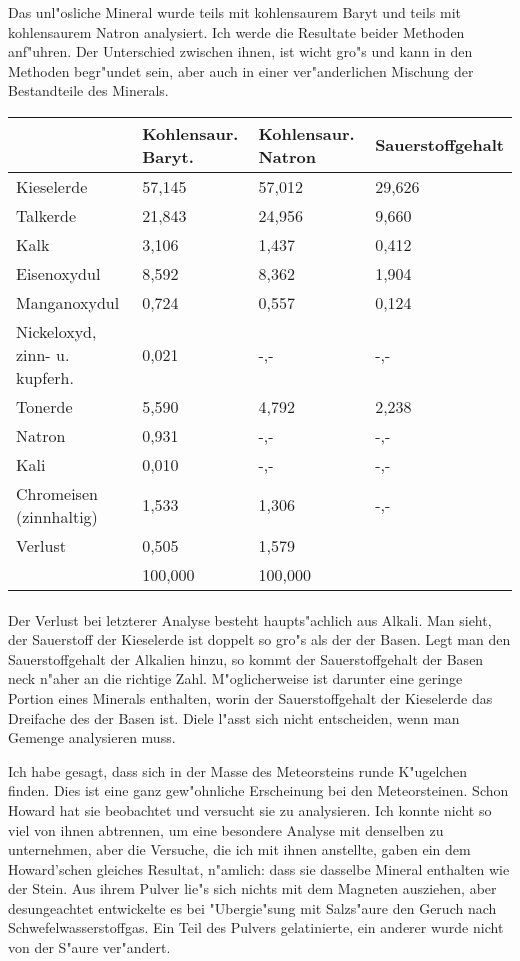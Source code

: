 \documentclass[a4paper, 11pt, oneside]{article}
\begin{document}
Das unl"osliche Mineral wurde teils mit kohlensaurem Baryt und teils mit kohlensaurem Natron analysiert. Ich werde die Resultate beider Methoden anf"uhren. Der Unterschied zwischen ihnen, ist wicht gro"s und kann in den Methoden begr"undet sein, aber auch in einer ver"anderlichen Mischung der Bestandteile des Minerals.
\begin{center}
\begin{tabular}{ |p{33mm}|p{24mm}|p{24mm}|p{35mm}| }
    \hline
      & Kohlensaur. Baryt. & Kohlensaur. Natron & Sauerstoffgehalt\\\hline
    Kieselerde & 57,145 & 57,012 & 29,626\\\hline
    Talkerde & 21,843 & 24,956 & 9,660\\\hline
    Kalk & 3,106 & 1,437 & 0,412\\\hline
    Eisenoxydul & 8,592 & 8,362 & 1,904\\\hline
    Manganoxydul & 0,724 & 0,557  & 0,124\\\hline
    Nickeloxyd, zinn- u. kupferh. & 0,021  & -,-  & -,-\\\hline
    Tonerde & 5,590 & 4,792 & 2,238\\\hline
    Natron & 0,931 & -,- & -,-\\\hline
    Kali & 0,010 & -,-  & -,-\\\hline
    Chromeisen (zinnhaltig) & 1,533 & 1,306 & -,-\\\hline
    Verlust & 0,505 & 1,579 & \\\hline
     & 100,000 & 100,000 & \\
    \hline
\end{tabular}
\end{center}
\paragraph{}
Der Verlust bei letzterer Analyse besteht haupts"achlich aus Alkali. Man sieht, der Sauerstoff der Kieselerde ist doppelt so gro"s als der der Basen. Legt man den Sauerstoffgehalt der Alkalien hinzu, so kommt der Sauerstoffgehalt der Basen neck n"aher an die richtige Zahl. M"oglicherweise ist darunter eine geringe Portion eines Minerals enthalten, worin der Sauerstoffgehalt der Kieselerde das Dreifache des der Basen ist. Diele l"asst sich nicht entscheiden, wenn man Gemenge analysieren muss.

Ich habe gesagt, dass sich in der Masse des Meteorsteins runde K"ugelchen finden. Dies ist eine ganz gew"ohnliche Erscheinung bei den Meteorsteinen. Schon Howard hat sie beobachtet und versucht sie zu analysieren. Ich konnte nicht so viel von ihnen abtrennen, um eine besondere Analyse mit denselben zu unternehmen, aber die Versuche, die ich mit ihnen anstellte, gaben ein dem Howard'schen gleiches Resultat, n"amlich: dass sie dasselbe Mineral enthalten wie der Stein. Aus ihrem Pulver lie"s sich nichts mit dem Magneten ausziehen, aber desungeachtet entwickelte es bei "Ubergie"sung mit Salzs"aure den Geruch nach Schwefelwasserstoffgas. Ein Teil des Pulvers gelatinierte, ein anderer wurde nicht von der S"aure ver"andert.
\end{document}
